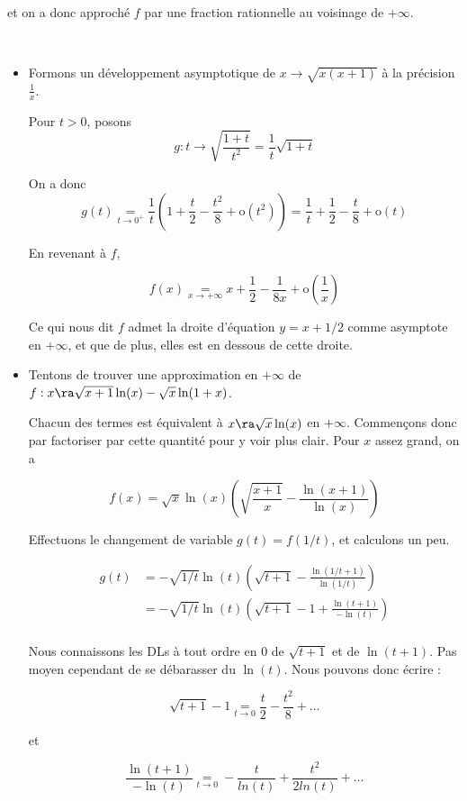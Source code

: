 \documentclass[12pt]{article}
\begin{document}
et on a donc approché $f$ par une fraction rationnelle au voisinage de
$+\infty$.

\begin{Exems}~

\begin{itemize}

\item Formons un développement asymptotique de $x\rightarrow \sqrt{x(x+1)}$ à la
  précision $\frac{1}{x}$. 


Pour $t>0$, posons $$g:t\rightarrow \sqrt{\frac{1+t}{t^2}}=\frac{1}{t}\sqrt{1+t}$$

On a donc $$g(t)\underset{t\rightarrow 0^+}{=} \frac{1}{t} (1+\frac{t}{2}-\frac{t^2}{8}+\text{o}(t^2))=\frac{1}{t}+\frac{1}{2}-\frac{t}{8}+\text{o}(t)$$

En revenant à $f$,

$$f(x)\underset{x\rightarrow +\infty}{=} x+\frac{1}{2}-\frac{1}{8x}+\text{o}\left(\frac{1}{x}\right)$$

Ce qui nous dit $f$ admet la droite d'équation $y=x+1/2$ comme asymptote en
$+\infty$, et que de plus, elles est en dessous de cette droite.

\item Tentons de trouver une approximation en $+\infty$ de $f:x\ra
  \sqrt{x+1}\ln(x) - \sqrt{x}\ln(1+x)$.

Chacun des termes est équivalent à $x\ra \sqrt{x}\ln(x)$ en
$+\infty$. Commençons donc par factoriser par cette quantité pour y voir
plus clair. Pour $x$ assez grand, on a 

$$f(x)=\sqrt{x}\ln(x)\left(\sqrt{\frac{x+1}{x}}-\frac{\ln(x+1)}{\ln(x)}\right) $$

Effectuons le changement de variable $g(t)=f(1/t)$, et calculons un peu.

\begin{align*}
g(t)
&=-\sqrt{1/t}\ln(t)\left(\sqrt{t+1}-\frac{\ln(1/t+1)}{\ln(1/t)}\right)\\
&= -\sqrt{1/t}\ln(t)\left(\sqrt{t+1}-1+\frac{\ln(t+1)}{-\ln(t)}\right) \\
\end{align*}

Nous connaissons les DLs à tout ordre en 0 de $\sqrt{t+1}$ et de
$\ln(t+1)$. Pas moyen cependant de se débarasser du $\ln(t)$. Nous
pouvons donc écrire :

$$\sqrt{t+1}-1\underset{t\rightarrow 0}{=}
\frac{t}{2}-\frac{t^2}{8}+ \dots$$ 

et 

$$
\frac{\ln(t+1)}{-\ln(t)}\underset{t\rightarrow 0}{=}-\frac{t}{ln(t)}+\frac{t^2}{2ln(t)}+\dots
$$


\end{itemize}
\end{Exems}
\end{document}
